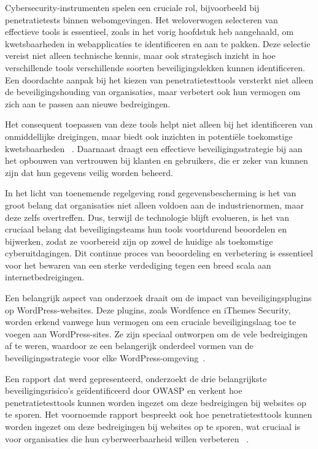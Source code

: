 Cybersecurity-instrumenten spelen een cruciale rol, bijvoorbeeld bij penetratietests binnen webomgevingen. Het weloverwogen 
selecteren van effectieve tools is essentieel, zoals in het vorig hoofdstuk heb aangehaald, om kwetsbaarheden in webapplicaties te identificeren en aan te pakken. 
Deze selectie vereist niet alleen technische kennis, maar ook strategisch inzicht in hoe verschillende tools verschillende 
soorten beveiligingslekken kunnen identificeren.
Een doordachte aanpak bij het kiezen van penetratietesttools versterkt niet alleen de beveiligingshouding 
van organisaties, maar verbetert ook hun vermogen om zich aan te passen aan nieuwe bedreigingen. 

Het consequent toepassen van deze tools helpt niet alleen bij het identificeren van onmiddellijke dreigingen, maar 
biedt ook inzichten in potentiële toekomstige kwetsbaarheden ~\autocite{Albahar2022}.
Daarnaast draagt een effectieve beveiligingsstrategie bij aan het opbouwen van vertrouwen bij klanten en gebruikers, die er 
zeker van kunnen zijn dat hun gegevens veilig worden beheerd. 

In het licht van toenemende regelgeving rond gegevensbescherming 
is het van groot belang dat organisaties niet alleen voldoen aan de industrienormen, maar deze zelfs overtreffen.
Dus, terwijl de technologie blijft evolueren, is het van cruciaal belang dat beveiligingsteams hun tools voortdurend 
beoordelen en bijwerken, zodat ze voorbereid zijn op zowel de huidige als toekomstige cyberuitdagingen. Dit continue 
proces van beoordeling en verbetering is essentieel voor het bewaren van een sterke verdediging tegen een breed scala 
aan internetbedreigingen.

Een belangrijk aspect van onderzoek draait om de impact van beveiligingsplugins op WordPress-websites. Deze plugins, zoals Wordfence en iThemes Security, worden 
erkend vanwege hun vermogen om een cruciale beveiligingslaag toe te voegen aan WordPress-sites. Ze zijn speciaal ontworpen om de vele bedreigingen af 
te weren, waardoor ze een belangerijk onderdeel vormen van de beveiligingsstrategie voor elke WordPress-omgeving~\autocite{Casola2020}.

Een rapport dat werd gepresenteerd, onderzoekt de drie belangrijkste beveiligingsrisico's geïdentificeerd door OWASP en verkent hoe penetratietesttools kunnen 
worden ingezet om deze bedreigingen bij websites op te sporen. Het voornoemde rapport bespreekt ook hoe 
penetratietesttools kunnen worden ingezet om deze bedreigingen bij websites op te sporen, wat cruciaal is voor organisaties die hun cyberweerbaarheid willen verbeteren
~\autocite{Sharma2023}.

